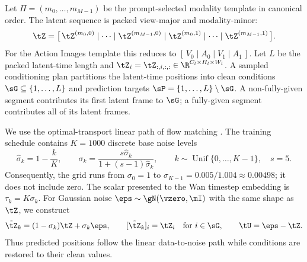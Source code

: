 Let $\Pi=(m_0,\ldots,m_{M-1})$ be the prompt-selected modality template in canonical order. The
latent sequence is packed view-major and modality-minor:
\begin{equation}
    \tZ
    =\big[\,\tZ^{(m_0,0)}\mid\cdots\mid\tZ^{(m_{M-1},0)}
      \mid\tZ^{(m_0,1)}\mid\cdots\mid\tZ^{(m_{M-1},1)}\,\big].
    \label{eq:prelim-packing}
\end{equation}
For the Action Images template this reduces to
$[\,V_0\mid A_0\mid V_1\mid A_1\,]$. Let $L$ be the packed latent-time length and
$\tZ_i=\tZ_{:,i,:,:}\in\R^{C_l\times H_l\times W_l}$. A sampled conditioning plan partitions
the latent-time positions into clean conditions $\sG\subseteq\{1,\ldots,L\}$ and prediction
targets $\sP=\{1,\ldots,L\}\setminus\sG$. A non-fully-given segment contributes its first latent
frame to $\sG$; a fully-given segment contributes all of its latent frames.

We use the optimal-transport linear path of flow matching \citep{lipman2023flow}. The training
schedule contains $K=1000$ discrete base noise levels
\begin{equation}
    \hat\sigma_k=1-\frac{k}{K},
    \qquad
    \sigma_k=\frac{s\hat\sigma_k}{1+(s-1)\hat\sigma_k},
    \qquad
    k\sim\operatorname{Unif}\{0,\ldots,K-1\},\quad s=5.
    \label{eq:prelim-shifted-schedule}
\end{equation}
Consequently, the grid runs from $\sigma_0=1$ to
$\sigma_{K-1}=0.005/1.004\approx0.00498$; it does not include zero. The scalar presented to the
Wan timestep embedding is $\tau_k=K\sigma_k$. For Gaussian noise
$\eps\sim\gN(\vzero,\mI)$ with the same shape as $\tZ$, we construct
\begin{equation}
    \tilde\tZ_k=(1-\sigma_k)\tZ+\sigma_k\eps,
    \qquad
    [\tilde\tZ_k]_i=\tZ_i\quad\text{for }i\in\sG,
    \qquad
    \tU=\eps-\tZ.
    \label{eq:prelim-noise}
\end{equation}
Thus predicted positions follow the linear data-to-noise path while conditions are restored to
their clean values.

